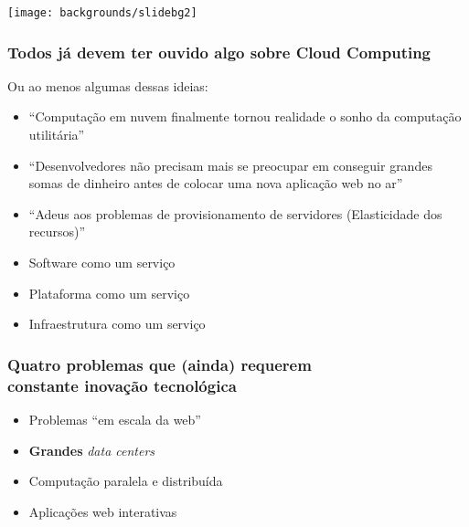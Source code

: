 \documentclass[Ligatures=TeX,table,brazil,svgnames,usetotalslideindicator,comp
ress,10pt]{beamer}
\newcommand{\setsectionbg}{
    \setbeamertemplate{background}
     {\texttt{[image: backgrounds/slidebg2]}}
}
\begin{document}
\setsectionbg
\begin{frame}
  \frametitle{Todos já devem ter ouvido algo sobre Cloud Computing}

  Ou ao menos algumas dessas ideias:

  \begin{itemize}[<+->]
  \item ``Computação em nuvem finalmente tornou realidade o sonho da
    computação utilitária''
  \item ``Desenvolvedores não precisam mais se preocupar em conseguir
    grandes somas de dinheiro antes de colocar uma nova aplicação web
    no ar''
  \item ``Adeus aos problemas de provisionamento de servidores
    (Elasticidade dos recursos)''
  \item Software como um serviço
  \item Plataforma como um serviço
  \item Infraestrutura como um serviço
  \end{itemize}

\end{frame}

\begin{frame}
  \frametitle{Quatro problemas que (ainda) requerem\\ constante inovação
    tecnológica}

  \begin{itemize}
  \item Problemas ``em escala da web''
  \item \textbf{Grandes} \textit{data centers}
  \item Computação paralela e distribuída
  \item Aplicações web interativas
  \end{itemize}

\end{frame}
\end{document}
